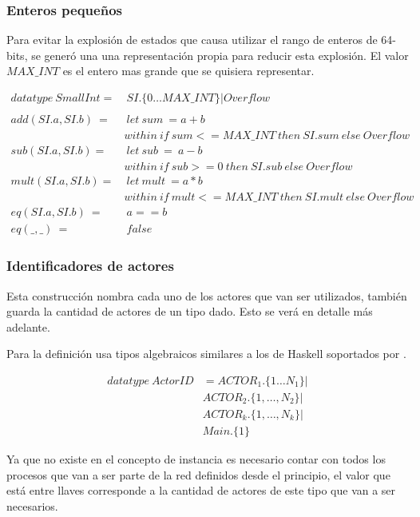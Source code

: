 \subsubsection{Enteros pequeños}

Para evitar la explosión de estados que causa utilizar el rango de enteros de 64-bits, se generó una una representación propia para reducir esta explosión. El valor $MAX\_INT$ es el entero mas grande que se quisiera representar.

\begin{align*}
datatype\ SmallInt =&\ SI.\{0 \ldots MAX\_INT\} | Overflow \\
\\
add(SI.a, SI.b)\ =&\ let\ sum\ = a + b \\
&within\ if\ sum <= MAX\_INT\ then\ SI.sum\ else\ Overflow  \\
%
sub(SI.a, SI.b) =&\ let\ sub\ =\ a - b \\
& within\ if\ sub >= 0\ then\ SI.sub\ else\ Overflow \\
%
mult(SI.a, SI.b) =&\ let\ mult\ = a * b \\
& within\ if\ mult <= MAX\_INT\ then\ SI.mult\ else\ Overflow \\
eq(SI.a, SI.b)\ =&\ a == b \\
eq(\_, \_)\ =&\ false
\end{align*}

\subsubsection{Identificadores de actores}

Esta construcción nombra cada uno de los actores que van ser utilizados, también guarda la cantidad de actores de un tipo dado. Esto se verá en detalle más adelante.

Para la definición usa tipos algebraicos similares a los de Haskell soportados por \CSPm.

\begin{figure}[H]
\begin{align*}
  datatype\ ActorID &= ACTOR_1.\{1 \ldots N_1\} | \\
  & ACTOR_2.\{1, \ldots ,N_2\} | \\
  & ACTOR_k.\{1, \ldots, N_k\} | \\
  & Main.\{1\}
\end{align*}
\end{figure}

Ya que no existe en \CSP el concepto de instancia es necesario contar con todos los procesos que van a ser parte de la red definidos desde el principio, el valor que está entre llaves corresponde a la cantidad de actores de este tipo que van a ser necesarios. 

